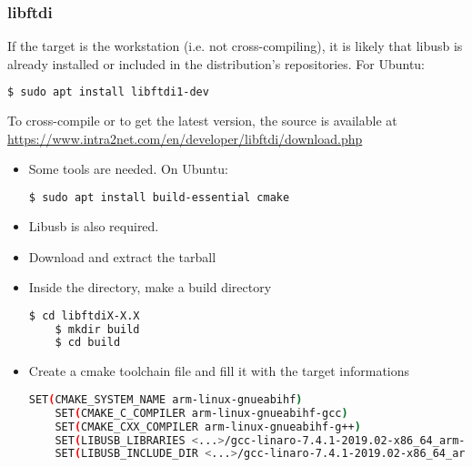 \documentclass{article}
\begin{document}
    \subsubsection{libftdi}
    
    If the target is the workstation (i.e. not cross-compiling), it is likely that libusb is already installed or included in the distribution's repositories. For Ubuntu:
    \begin{lstlisting}[language=bash]
    $ sudo apt install libftdi1-dev
    \end{lstlisting}
    
	To cross-compile or to get the latest version, the source is available at \url{https://www.intra2net.com/en/developer/libftdi/download.php}
    
    \begin{itemize}
    
	\item Some tools are needed. On Ubuntu:
	
	\begin{lstlisting}[language=bash]
    $ sudo apt install build-essential cmake
    \end{lstlisting}
    
    \item Libusb is also required.
    
    \item Download and extract the tarball
    
    \item Inside the directory, make a build directory
    
    \begin{lstlisting}[language=bash]
    $ cd libftdiX-X.X
    $ mkdir build
    $ cd build
    \end{lstlisting}
    
    \item Create a cmake toolchain file and fill it with the target informations
    
    \begin{lstlisting}[language=bash, title=toolchain-arm-linux-gnueabihf.cmake]
    SET(CMAKE_SYSTEM_NAME arm-linux-gnueabihf)
    SET(CMAKE_C_COMPILER arm-linux-gnueabihf-gcc)
    SET(CMAKE_CXX_COMPILER arm-linux-gnueabihf-g++)
    SET(LIBUSB_LIBRARIES <...>/gcc-linaro-7.4.1-2019.02-x86_64_arm-linux-gnueabihf/lib/libusb-1.0.so.0)
    SET(LIBUSB_INCLUDE_DIR <...>/gcc-linaro-7.4.1-2019.02-x86_64_arm-linux-gnueabihf/include/libusb-1.0)
    \end{lstlisting}
    

\end{itemize}
\end{document}
